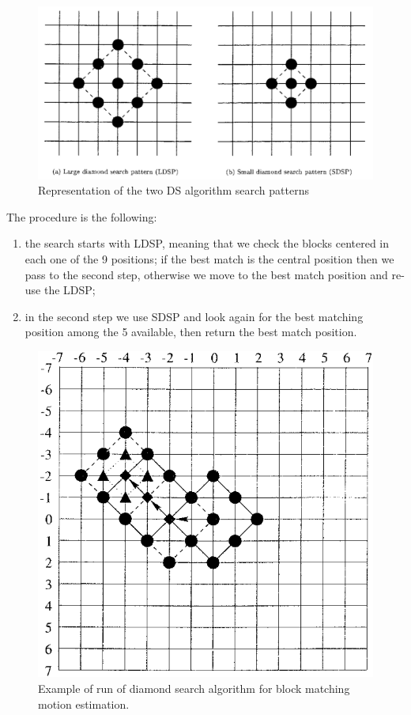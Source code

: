 \begin{figure}
    \centering
    \includegraphics[width=.95\linewidth]{../assets/images/ds-search-patterns.png}
    \caption{Representation of the two DS algorithm search patterns}
    \label{fig:ds-search-patterns}
\end{figure}

The procedure is the following:
\begin{enumerate}
    \item the search starts with LDSP, meaning that we check the blocks centered in each one of the 9 positions; if the best match is the central position then we pass to the second step, otherwise we move to the best match position and re-use the LDSP;
    \item in the second step we use SDSP and look again for the best matching position among the 5 available, then return the best match position.
\end{enumerate}

\begin{figure}
    \centering
    \includegraphics[width=.95\linewidth]{../assets/images/ds-exe.png}
    \caption{Example of run of diamond search algorithm for block matching motion estimation.}
    \label{fig:diamond-search-example}
\end{figure}

